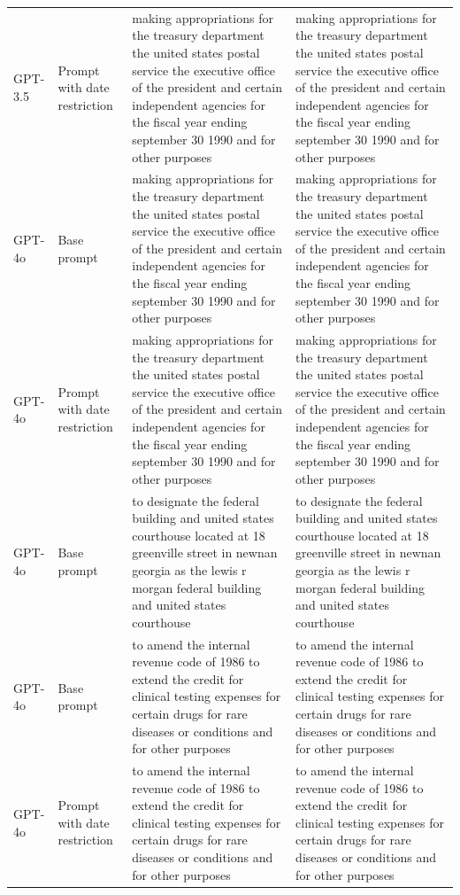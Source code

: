 \begin{longtable}{>{\raggedright\arraybackslash}p{1.4cm}>{\raggedright\arraybackslash}p{1.4cm}>{\raggedright\arraybackslash}p{5.5cm}>{\raggedright\arraybackslash}p{5.5cm}}
GPT-3.5 & Prompt with date restriction & making appropriations for the treasury department the united states postal service the executive office of the president and certain independent agencies for the fiscal year ending september 30 1990 and for other purposes & making appropriations for the treasury department the united states postal service the executive office of the president and certain independent agencies for the fiscal year ending september 30 1990 and for other purposes\\
GPT-4o & Base prompt & making appropriations for the treasury department the united states postal service the executive office of the president and certain independent agencies for the fiscal year ending september 30 1990 and for other purposes & making appropriations for the treasury department the united states postal service the executive office of the president and certain independent agencies for the fiscal year ending september 30 1990 and for other purposes\\
GPT-4o & Prompt with date restriction & making appropriations for the treasury department the united states postal service the executive office of the president and certain independent agencies for the fiscal year ending september 30 1990 and for other purposes & making appropriations for the treasury department the united states postal service the executive office of the president and certain independent agencies for the fiscal year ending september 30 1990 and for other purposes\\
GPT-4o & Base prompt & to designate the federal building and united states courthouse located at 18 greenville street in newnan georgia as the lewis r morgan federal building and united states courthouse & to designate the federal building and united states courthouse located at 18 greenville street in newnan georgia as the lewis r morgan federal building and united states courthouse\\
GPT-4o & Base prompt & to amend the internal revenue code of 1986 to extend the credit for clinical testing expenses for certain drugs for rare diseases or conditions and for other purposes & to amend the internal revenue code of 1986 to extend the credit for clinical testing expenses for certain drugs for rare diseases or conditions and for other purposes\\
GPT-4o & Prompt with date restriction & to amend the internal revenue code of 1986 to extend the credit for clinical testing expenses for certain drugs for rare diseases or conditions and for other purposes & to amend the internal revenue code of 1986 to extend the credit for clinical testing expenses for certain drugs for rare diseases or conditions and for other purposes\\

\end{longtable}
